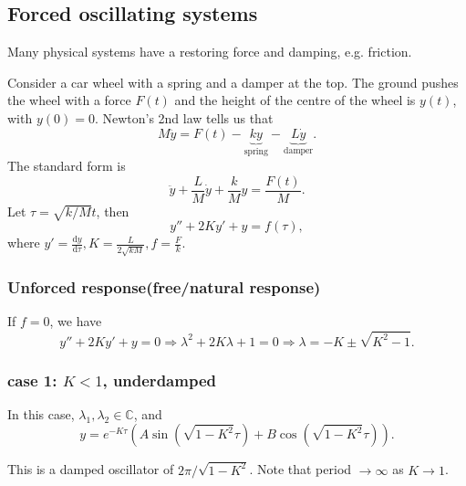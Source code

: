 \documentclass[a4paper]{article}
\begin{document}
    \subsection{Forced oscillating systems}
    Many physical systems have a restoring force and damping, e.g. friction.
    \begin{example}
        Consider a car wheel with a spring and a damper at the top. The ground pushes the wheel with a force $ F(t) $ and the height of the centre of the wheel is $y(t)$, with $y(0)=0$. Newton's 2nd law tells us that 
        \begin{equation}\label{eq:14.2}
            M\ddot{y} = F(t)-\underbrace{ky}_{\text{spring}}-\underbrace{L \dot{y}}_{\text{damper}}.
        \end{equation}
        The standard form is 
        \[
            \ddot{y}+\frac{L}{M}\dot{y}+\frac{k}{M}y=\frac{F(t)}{M}
        .\]
        Let $ \tau= \sqrt{k/M}t $, then 
        \[
            y''+2Ky'+y=f(\tau)
        ,\]
        where $ y'=\frac{\mathrm{d}y}{\mathrm{d}\tau}, K=\frac{L}{2\sqrt{kM}}, f=\frac{F}{k}  $.
    \end{example}
    \subsubsection{Unforced response(free/natural response)}
    If $f=0$, we have 
    \[
        y''+2Ky'+y=0 \Longrightarrow \lambda^2+2K \lambda+1=0 \Longrightarrow \lambda = -K\pm \sqrt{K^2-1}
    .\]
    \subsubsection*{case 1: $ K<1 $, underdamped}
    In this case, $ \lambda_1,\lambda_2\in \mathbb{C} $, and 
    \[
        y=e^{-K\tau}\left( A \sin \left( \sqrt{1-K^2}\tau \right)+B \cos \left( \sqrt{1-K^2}\tau \right) \right)
    .\]
    \begin{center}
      \end{center}
      This is a damped oscillator of $2\pi/\sqrt{1-K^2}$. Note that period $ \to \infty $ as $ K \to 1 $.
\end{document}
